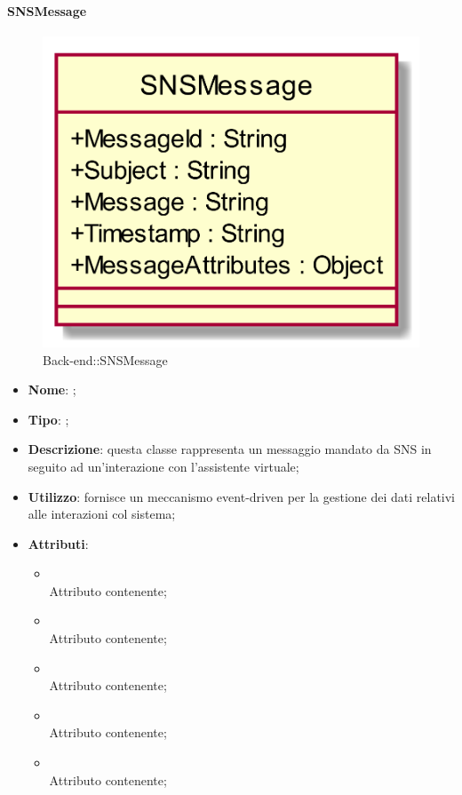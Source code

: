 \hypertarget{SNSMessage_label}{\paragraph{SNSMessage}}
\begin{figure}[h]
	\centering
	\includegraphics[width=\textwidth,height=\textheight,keepaspectratio]{images/ClassSNSMessage.png}
	\caption{Back-end::SNSMessage}
\end{figure}
\begin{itemize}
	\item \textbf{Nome}: ;
	\item \textbf{Tipo}: ;
	\item \textbf{Descrizione}: questa classe rappresenta un messaggio mandato da SNS in seguito ad un'interazione con l'assistente virtuale;
	\item \textbf{Utilizzo}: fornisce un meccanismo event-driven per la gestione dei dati relativi alle interazioni col sistema;
	\item \textbf{Attributi}:
	\begin{itemize}
		\item[]  \\
		Attributo contenente;
		\item[]  \\
		Attributo contenente;
		\item[]  \\
		Attributo contenente;
		\item[]  \\
		Attributo contenente;
		\item[]  \\
		Attributo contenente;
	\end{itemize}
\end{itemize}

